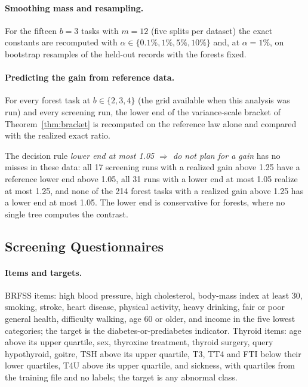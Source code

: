 


\paragraph{Smoothing mass and resampling.}
For the fifteen $b=3$ tasks with $m=12$ (five splits per dataset) the exact constants are recomputed with $\alpha\in\{0.1\%,1\%,5\%,10\%\}$ and, at $\alpha=1\%$, on bootstrap resamples of the held-out records with the forests fixed.


\paragraph{Predicting the gain from reference data.}
For every forest task at $b\in\{2,3,4\}$ (the grid available when this analysis was run) and every screening run, the lower end of the variance-scale bracket of Theorem~\ref{thm:bracket} is recomputed on the reference law alone and compared with the realized exact ratio.

The decision rule \emph{lower end at most 1.05 $\Rightarrow$ do not plan for a gain} has no misses in these data: all 17 screening runs with a realized gain above 1.25 have a reference lower end above 1.05, all 31 runs with a lower end at most 1.05 realize at most 1.25, and none of the 214 forest tasks with a realized gain above 1.25 has a lower end at most 1.05. The lower end is conservative for forests, where no single tree computes the contrast.

\subsection{Screening Questionnaires}\label{app:screening}\label{app:screendetail}
\paragraph{Items and targets.}
BRFSS items: high blood pressure, high cholesterol, body-mass index at least 30, smoking, stroke, heart disease, physical activity, heavy drinking, fair or poor general health, difficulty walking, age 60 or older, and income in the five lowest categories; the target is the diabetes-or-prediabetes indicator. Thyroid items: age above its upper quartile, sex, thyroxine treatment, thyroid surgery, query hypothyroid, goitre, TSH above its upper quartile, T3, TT4 and FTI below their lower quartiles, T4U above its upper quartile, and sickness, with quartiles from the training file and no labels; the target is any abnormal class.

